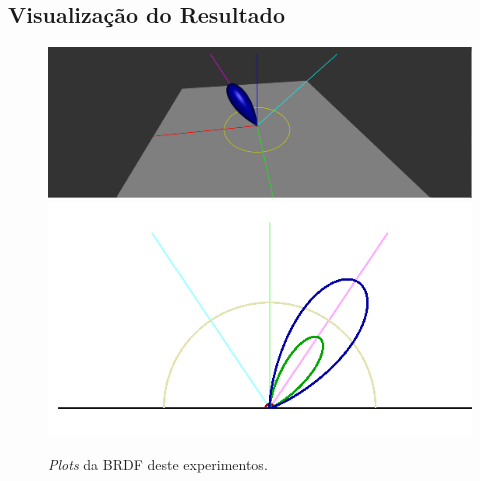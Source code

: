 \subsection{Visualização do Resultado}
\begin{figure}[H]
    \caption{\small{\textit{Plots} da BRDF deste experimentos.}}\label{fig-cook-torrance-plots}
    \vspace{42px}
  \includegraphics[width=\linewidth]{./Imagens/brdfs/cook-torrance-3D-plot}
\endminipage\hfill
{}
  \includegraphics[width=\linewidth]{./Imagens/brdfs/cook-torrance-polar-plot-log.png}
\endminipage\hfill
\end{figure}

